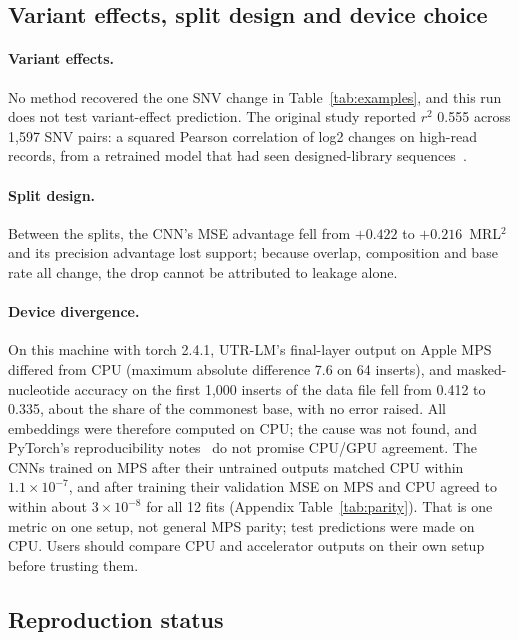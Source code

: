 \documentclass[11pt]{article}
\begin{document}
\subsection{Variant effects, split design and device choice}\label{sec:device}
\paragraph{Variant effects.} No method recovered the one SNV change in Table~\ref{tab:examples}, and this run does not
test variant-effect prediction. The original study reported $r^2$ 0.555 across 1,597 SNV pairs: a squared Pearson
correlation of log2 changes on high-read records, from a retrained model that had seen designed-library
sequences~\citep{sample2019}.

\paragraph{Split design.} Between the splits, the CNN's MSE advantage fell from $+0.422$ to $+0.216$~MRL$^2$ and its
precision advantage lost support; because overlap, composition and base rate all change, the drop cannot be attributed
to leakage alone.

\paragraph{Device divergence.} On this machine with torch 2.4.1, UTR-LM's final-layer output on Apple MPS differed from
CPU (maximum absolute difference 7.6 on 64 inserts), and masked-nucleotide accuracy on the first 1,000 inserts of the
data file fell from 0.412 to 0.335, about the share of the commonest base, with no error raised. All embeddings were
therefore computed on CPU; the cause was not found, and PyTorch's reproducibility notes~\citep{pytorch_repro} do not
promise CPU/GPU agreement. The CNNs trained on MPS after their untrained outputs matched CPU within
$1.1\times10^{-7}$, and after training their validation MSE on MPS and CPU agreed to within about $3\times10^{-8}$ for
all 12 fits (Appendix Table~\ref{tab:parity}). That is one metric on one setup, not general MPS parity; test predictions
were made on CPU. Users should compare CPU and accelerator outputs on their own setup before trusting them.

\subsection{Reproduction status}\label{sec:repro-status}
\noindent{}
\end{document}

